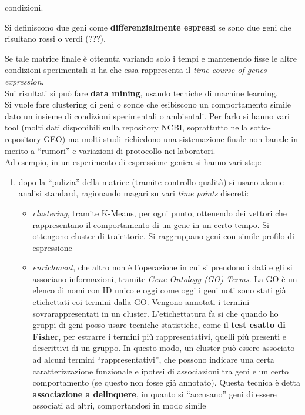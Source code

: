 \documentclass[a4paper,12pt, oneside]{book}
\begin{document}
condizioni.
\begin{definizione}
  Si definiscono due geni come \textbf{differenzialmente espressi} se sono due
  geni che risultano rossi o verdi (???).
\end{definizione}
Se tale matrice finale è ottenuta variando solo i tempi e mantenendo 
fisse le altre condizioni sperimentali si ha che essa rappresenta il
\textit{time-course of genes expression}.\\
Sui risultati si può fare \textbf{data mining}, usando tecniche di machine
learning. \\
Si vuole fare clustering di geni o sonde che esibiscono un comportamento simile
dato un insieme di condizioni sperimentali o ambientali. Per farlo si hanno vari
tool (molti dati disponibili sulla repository NCBI, soprattutto nella
sotto-repository GEO) ma molti studi richiedono
una sistemazione finale non banale in merito a ``rumori'' e variazioni di
protocollo nei laboratori. \\
Ad esempio, in un esperimento di espressione genica si hanno vari step:
\begin{enumerate}
  \item dopo la ``pulizia'' della matrice (tramite controllo qualità) si usano
  alcune analisi standard, ragionando magari su vari \textit{time points}
  discreti: 
  \begin{itemize}
    \item \textit{clustering}, tramite K-Means, per ogni punto, ottenendo dei
    vettori che rappresentano il comportamento  di un gene in un certo tempo. Si
    ottengono cluster di traiettorie. Si raggruppano geni con simile profilo di
    espressione 
    \item \textit{enrichment}, che altro non è l'operazione in cui si prendono i
    dati e gli si associano informazioni, tramite \textit{Gene Ontology (GO)
      Terms}. La GO è un elenco di nomi con ID unico e oggi come oggi i geni
    noti sono stati già etichettati coi termini dalla GO. Vengono annotati i
    termini sovrarappresentati in un cluster. L'etichettatura fa si che quando
    ho gruppi di geni posso usare tecniche statistiche, come il \textbf{test
      esatto di Fisher}, per estrarre i termini più rappresentativi, quelli più
    presenti e descrittivi di un gruppo. In 
    questo modo, un cluster può essere associato ad alcuni termini
    ``rappresentativi'', che possono indicare una certa caratterizzazione
    funzionale e ipotesi di associazioni tra geni e un certo comportamento (se
    questo non fosse già annotato). Questa tecnica è detta \textbf{associazione
      a delinquere}, in quanto si ``accusano'' geni di essere associati ad
    altri, comportandosi in modo simile
  \end{itemize}
\end{enumerate}
\end{document}
